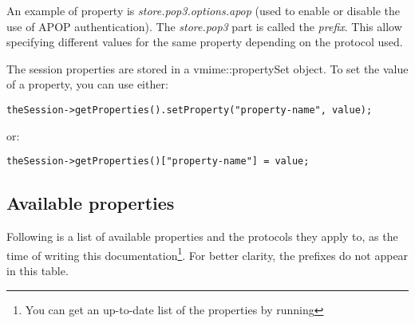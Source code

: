 An example of property is \emph{store.pop3.options.apop} (used to enable or
disable the use of APOP authentication). The \emph{store.pop3} part is called
the \emph{prefix}. This allow specifying different values for the same
property depending on the protocol used.

The session properties are stored in a {\vcode vmime::propertySet} object.
To set the value of a property, you can use either:

\begin{lstlisting}
theSession->getProperties().setProperty("property-name", value);
\end{lstlisting}

or:

\begin{lstlisting}
theSession->getProperties()["property-name"] = value;
\end{lstlisting}


\subsection{Available properties} %

Following is a list of available properties and the protocols they apply to,
as the time of writing this documentation\footnote{You can get an up-to-date
list of the properties by running }. For better clarity,
the prefixes do not appear in this table.

